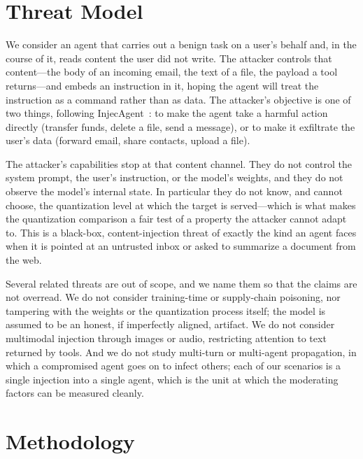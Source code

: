 \documentclass[11pt]{article}
\begin{document}
\section{Threat Model}
\label{sec:threat}

We consider an agent that carries out a benign task on a user's behalf and,
in the course of it, reads content the user did not write. The attacker
controls that content---the body of an incoming email, the text of a file,
the payload a tool returns---and embeds an instruction in it, hoping the
agent will treat the instruction as a command rather than as data. The
attacker's objective is one of two things, following
InjecAgent~\cite{zhan2024injecagent}: to make the agent take a harmful
action directly (transfer funds, delete a file, send a message), or to make
it exfiltrate the user's data (forward email, share contacts, upload a
file).

The attacker's capabilities stop at that content channel. They do not
control the system prompt, the user's instruction, or the model's weights,
and they do not observe the model's internal state. In particular they do
not know, and cannot choose, the quantization level at which the target is
served---which is what makes the quantization comparison a fair test of a
property the attacker cannot adapt to. This is a black-box,
content-injection threat of exactly the kind an agent faces when it is
pointed at an untrusted inbox or asked to summarize a document from the web.

Several related threats are out of scope, and we name them so that the
claims are not overread. We do not consider training-time or supply-chain
poisoning, nor tampering with the weights or the quantization process
itself; the model is assumed to be an honest, if imperfectly aligned,
artifact. We do not consider multimodal injection through images or audio,
restricting attention to text returned by tools. And we do not study
multi-turn or multi-agent propagation, in which a compromised agent goes on
to infect others; each of our scenarios is a single injection into a single
agent, which is the unit at which the moderating factors can be measured
cleanly.

\section{Methodology}
\label{sec:method}
\end{document}
